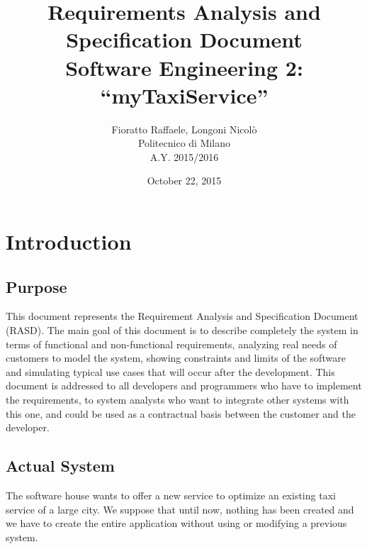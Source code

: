 \documentclass[a4paper,12pt]{article}%
\begin{document}
\begin{figure}
  \centering
	\def\svgwidth{\columnwidth}
    \resizebox{0.35\textwidth}{!}{}
\end{figure}
\title{{\Huge \textbf{R}equirements \textbf{A}nalysis and\\
\textbf{S}pecification \textbf{D}ocument}\\{\Large Software Engineering 2: ``myTaxiService''}}

\author{Fioratto Raffaele, Longoni Nicol\`{o}
\\Politecnico di Milano
\\{\small A.Y. 2015/2016}}
\date{October 22, 2015}
\maketitle
\newpage
\tableofcontents
\newpage
\section{Introduction}

\subsection{Purpose}
This document represents the Requirement Analysis and Specification Document
(RASD). The main goal of this document is to describe completely the system
in terms of functional and non-functional requirements, analyzing real needs
of customers to model the system, showing constraints and limits
of the software and simulating typical use cases that will occur after the
development. This document is addressed to all developers and programmers who
have to implement the requirements, to system analysts who want to integrate
other systems with this one, and could be used as a contractual basis between
the customer and the developer.

\subsection{Actual System}
The software house wants to offer a new service to optimize an existing 
taxi service of a large city. We suppose that until now, nothing has been 
created and we have to create the entire application without using or modifying 
a previous system.
\end{document}
